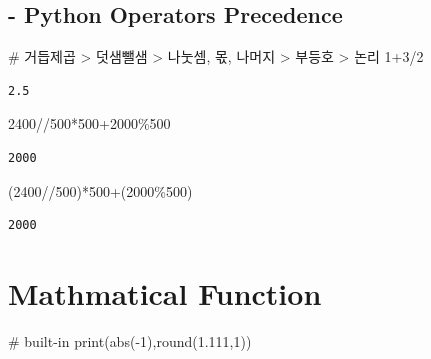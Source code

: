 \documentclass[
  letterpaper,
  DIV=11,
  numbers=noendperiod]{scrreprt}
\newenvironment{Shaded}{\begin{snugshade}}{\end{snugshade}}
\newcommand{\BuiltInTok}[1]{\textcolor[rgb]{0.00,0.23,0.31}{#1}}
\newcommand{\CommentTok}[1]{\textcolor[rgb]{0.37,0.37,0.37}{#1}}
\newcommand{\DecValTok}[1]{\textcolor[rgb]{0.68,0.00,0.00}{#1}}
\newcommand{\FloatTok}[1]{\textcolor[rgb]{0.68,0.00,0.00}{#1}}
\newcommand{\NormalTok}[1]{\textcolor[rgb]{0.00,0.23,0.31}{#1}}
\newcommand{\OperatorTok}[1]{\textcolor[rgb]{0.37,0.37,0.37}{#1}}
\begin{document}
\subsection{- Python Operators
Precedence}\label{python-operators-precedence-1}

\begin{Shaded}
\begin{Highlighting}[]
\CommentTok{\# 거듭제곱 \textgreater{} 덧샘뺄샘 \textgreater{} 나눗셈, 몫, 나머지 \textgreater{} 부등호 \textgreater{} 논리}
\DecValTok{1}\OperatorTok{+}\DecValTok{3}\OperatorTok{/}\DecValTok{2}
\end{Highlighting}
\end{Shaded}

\begin{verbatim}
2.5
\end{verbatim}

\begin{Shaded}
\begin{Highlighting}[]
\DecValTok{2400}\OperatorTok{//}\DecValTok{500}\OperatorTok{*}\DecValTok{500}\OperatorTok{+}\DecValTok{2000}\OperatorTok{\%}\DecValTok{500}
\end{Highlighting}
\end{Shaded}

\begin{verbatim}
2000
\end{verbatim}

\begin{Shaded}
\begin{Highlighting}[]
\NormalTok{(}\DecValTok{2400}\OperatorTok{//}\DecValTok{500}\NormalTok{)}\OperatorTok{*}\DecValTok{500}\OperatorTok{+}\NormalTok{(}\DecValTok{2000}\OperatorTok{\%}\DecValTok{500}\NormalTok{)}
\end{Highlighting}
\end{Shaded}

\begin{verbatim}
2000
\end{verbatim}

\section{Mathmatical Function}\label{mathmatical-function}

\begin{Shaded}
\begin{Highlighting}[]
\CommentTok{\# built{-}in}
\BuiltInTok{print}\NormalTok{(}\BuiltInTok{abs}\NormalTok{(}\OperatorTok{{-}}\DecValTok{1}\NormalTok{),}\BuiltInTok{round}\NormalTok{(}\FloatTok{1.111}\NormalTok{,}\DecValTok{1}\NormalTok{))}
\end{Highlighting}
\end{Shaded}
\end{document}

